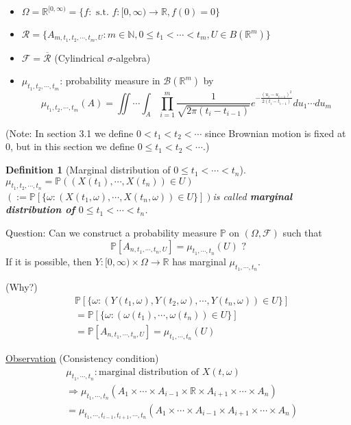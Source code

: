 \documentclass[12pt]{report}
\newcommand{\R}{\mathbb{R}}
\renewcommand{\P}{\mathbb{P}}
\newcommand{\F}{\mathcal{F}}
\renewcommand{\1}{\mathbb{1}}
\renewcommand{\O}{\Omega}
\theoremstyle{break}
\theoremstyle{newdef}
\newtheorem{defn}[thm]{Definition} %
\theoremstyle{remark}
\begin{document}
\begin{itemize}
\item $\O = \R^{[0,\infty)} = \{ f : \text{ s.t. } f : [0,\infty) \rightarrow \R, f(0) = 0\}$
\item $\mathcal{R} = \{ A_{m, t_1, t_2, \cdots, t_m, U} : m \in \mathbb{N}, 0 \leq t_1 < \cdots < t_m, U \in B(\R^m)\}$
\item $\F = \overline{\mathcal{R}}$ (Cylindrical $\sigma$-algebra)
\item $\mu_{t_1,t_2,\cdots,t_m}$: probability measure in $\mathcal{B}(\R^m)$ by
$$\mu_{t_1,t_2,\cdots,t_m}(A) = \iint \cdots \int_A \prod_{i=1}^{m} \frac{1}{\sqrt{2\pi(t_i-t_{i-1})}} e^{-\frac{(u_i-u_{i-1})^2}{2(t_i-t_{i-1})}} du_1\cdots du_m$$
\end{itemize}
(Note: In section 3.1 we define $0 < t_1 < t_2 < \cdots$ since Brownian motion is fixed at $0$, but in this section we define $0 \leq t_1 < t_2 < \cdots$.)

\begin{defn}[Marginal distribution of $0\leq t_1 < \cdots < t_n$]
$\mu_{t_1,t_2,\cdots,t_n} = \P((X(t_1), \cdots, X(t_n)) \in U)$ $(:= \P[\{\omega: (X(t_1,\omega),\cdots,X(t_n,\omega))\in U\}])$is called \textbf{marginal distribution of $0 \leq t_1 < \cdots < t_n$}.
\end{defn}

Question: Can we construct a probability measure $\P$ on $(\O,\F)$ such that
$$\P[A_{n,t_1,\cdots,t_n,U}]=\mu_{t_1,\cdots,t_n}(U)\text{ ?}$$
If it is possible, then
$Y : [0,\infty)\times \O \rightarrow \R$
has marginal $\mu_{t_1,\cdots,t_n}$.

(Why?)
$$
\begin{aligned}
&\P[\{\omega: (Y(t_1,\omega), Y(t_2,\omega),\cdots,Y(t_n,\omega) )\in U\}]\\
&= \P[\{\omega : (\omega(t_1), \cdots, \omega(t_n)) \in U\}]\\
&= \P[A_{n,t_1,\cdots,t_n,U}] = \mu_{t_1,\cdots,t_n}(U)
\end{aligned}
$$




\underline{Observation} (Consistency condition)
$$
\begin{aligned}
&\mu_{t_1,\cdots,t_n}: \text{marginal distribution of } X(t,\omega)\\
&\Rightarrow \mu_{t_1,\cdots,t_n}(A_1\times\cdots\times A_{i-1}\times\R\times A_{i+1}\times\cdots\times A_n)\\
&=\mu_{t_1,\cdots,t_{i-1},t_{i+1},\cdots,t_n}(A_1\times\cdots\times A_{i-1}\times A_{i+1}\times\cdots\times A_n)\\
\end{aligned}
$$
\end{document}
